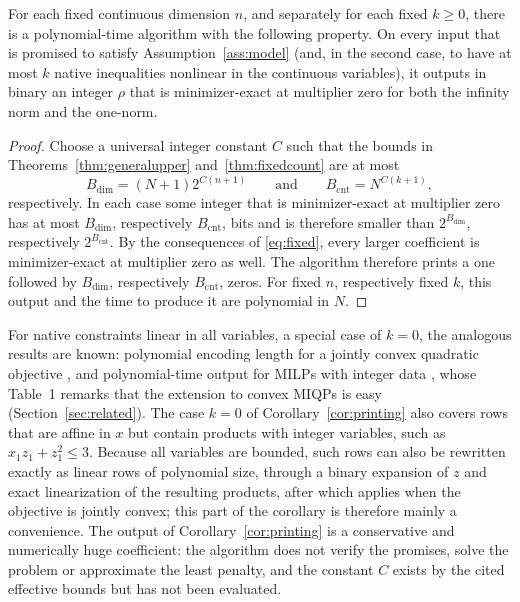 \begin{corollary}\label{cor:printing}
For each fixed continuous dimension $n$, and separately for each fixed
$k\ge0$, there is a polynomial-time algorithm with the following property.
On every input that is promised to satisfy Assumption~\ref{ass:model}
(and, in the second case, to have at most $k$ native inequalities
nonlinear in the continuous variables), it outputs in binary an integer
$\rho$ that is minimizer-exact at multiplier zero for both the infinity
norm and the one-norm.
\end{corollary}
\begin{proof}
Choose a universal integer constant $C$ such that the bounds in
Theorems~\ref{thm:generalupper} and~\ref{thm:fixedcount} are at most
\[
 B_{\mathrm{dim}}=(N+1)2^{C(n+1)}\qquad\text{and}\qquad
 B_{\mathrm{cnt}}=N^{C(k+1)},
\]
respectively. In each case some integer that is minimizer-exact at
multiplier zero has at most $B_{\mathrm{dim}}$, respectively
$B_{\mathrm{cnt}}$, bits and is therefore smaller than
$2^{B_{\mathrm{dim}}}$, respectively $2^{B_{\mathrm{cnt}}}$. By the
consequences of \eqref{eq:fixed}, every larger coefficient is
minimizer-exact at multiplier zero as well. The algorithm therefore prints
a one followed by $B_{\mathrm{dim}}$, respectively $B_{\mathrm{cnt}}$,
zeros. For fixed $n$,
respectively fixed $k$, this output and the time to produce it are
polynomial in $N$.
\end{proof}
For native constraints linear in all variables, a special case of
$k=0$, the analogous results are known: polynomial encoding length for a
jointly convex quadratic objective \citep[Theorem~11]{GuAhmedDey2020},
and polynomial-time output for MILPs with integer data
\citep[Theorem~15]{LefebvreSchmidt2025}, whose Table~1 remarks that the
extension to convex MIQPs is easy (Section~\ref{sec:related}). The case
$k=0$ of Corollary~\ref{cor:printing} also covers rows that are affine in
$x$ but contain products with integer variables, such as
$x_1z_1+z_1^2\le3$. Because all variables are bounded, such rows can
also be rewritten exactly as linear rows of polynomial size, through a
binary expansion of $z$ and exact linearization of the resulting
products, after which \citet[Theorem~11]{GuAhmedDey2020} applies when the
objective is jointly convex; this part of the corollary is therefore
mainly a convenience. The
output of Corollary~\ref{cor:printing} is a
conservative and numerically huge coefficient: the algorithm does not
verify the promises, solve the problem or approximate the least penalty,
and the constant $C$ exists by the cited effective bounds but has not
been evaluated.
